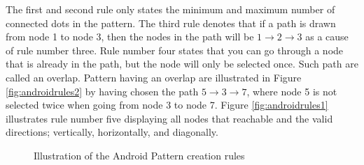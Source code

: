   The first and second rule only states the minimum and maximum number of connected dots in the pattern. The third rule denotes that if a path is drawn from node 1 to node 3, then the nodes in the path will be $1 \rightarrow 2 \rightarrow 3$ as a cause of rule number three. Rule number four states that you can go through a node that is already in the path, but the node will only be selected once. Such path are called an overlap. Pattern having an overlap are illustrated in Figure \ref{fig:androidrules2} by having chosen the path $5 \rightarrow 3 \rightarrow 7$, where node 5 is not selected twice when going from node 3 to node 7. Figure \ref{fig:androidrules1} illustrates rule number five displaying all nodes that reachable and the valid directions; vertically, horizontally, and diagonally. 

	  \begin{figure}[H]
	  	\centering
	    \hspace{0.8cm}
	    \caption{Illustration of the Android Pattern creation rules}
	    \label{fig:androidrules}
	  \end{figure}

